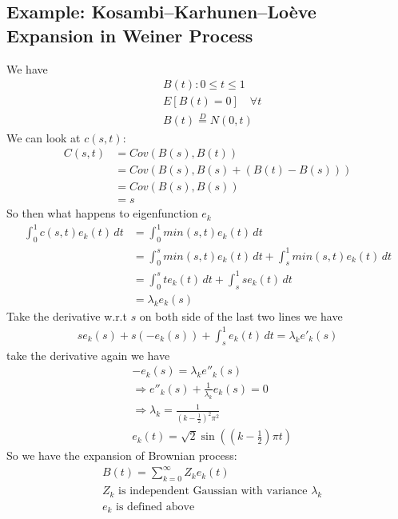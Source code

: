 \subsection{Example: Kosambi–Karhunen–Loève Expansion in Weiner Process}
We have 
    \begin{align*}
        & B(t) : 0 \leq t \leq 1 \\
        & E[B(t) = 0] \quad \forall t \\
        & B(t) \overset{D}{=}N(0, t)
    \end{align*}
We can look at $c(s,t)$: 
    \begin{align*}
        C(s,t) 
        & = Cov(B(s), B(t))\\
        & = Cov(B(s), B(s) + (B(t) - B(s))) \tag{Notice $B(t) - B(s)$ is independent from $B(s)$}  \\
        & = Cov(B(s), B(s)) \tag{$s = min(s,t)$} \\
        & = s
    \end{align*}
So then what happens to eigenfunction $e_k$
    \begin{align*}
        \int_0^1 c(s,t)e_k(t) \, dt 
        & = \int_0^1 min(s,t) e_k(t) \, dt \\
        & = \int_0^s min(s,t) e_k(t) \, dt + \int_s^1 min(s,t)e_k(t) \, dt\\
        & = \int_0^s t e_k(t) \, dt + \int_s^1 s e_k(t) \, dt\\
        & = \lambda_k e_k(s) \tag{From Mercer's Theorem}
    \end{align*}
Take the derivative w.r.t $s$ on both side of the last two lines we have 
    \begin{align*}
        s e_k(s) + s(-e_k(s)) + \int_s^1 e_k(t) \, dt = \lambda_k e'_k(s) 
    \end{align*}
take the derivative again we have 
    \begin{align*}
        & -e_k(s) = \lambda_k e''_k(s) \\
        & \Longrightarrow e''_k(s) + \frac{1}{\lambda_k}e_k(s) = 0\\
        & \Longrightarrow \lambda_k = \frac{1}{(k-\frac{1}{2})^2 \pi^2} \\
        & e_k(t) = \sqrt{2}\sin((k-\frac{1}{2})\pi t)
    \end{align*}
So we have the expansion of Brownian process: 
    \begin{align*}
        & B(t) = \sum_{k=0}^\infty Z_k e_k(t) \\
        & Z_k \text{ is independent Gaussian with variance $\lambda_k$} \\
        & e_k \text{ is defined above} 
    \end{align*}
